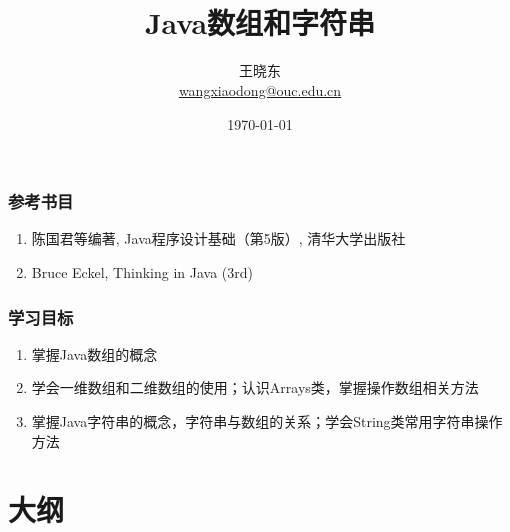 
\title[Wang Xiaodong]{\\  
  Java数组和字符串}
\author[王晓东]{王晓东\\
  \href{mailto:wangxiaodong@ouc.edu.cn}{\footnotesize wangxiaodong@ouc.edu.cn}}
\date{\today}


\frame{\titlepage}

\begin{frame}
\frametitle{参考书目}
\begin{enumerate}
\item 陈国君等编著, Java程序设计基础（第5版）, 清华大学出版社
\item Bruce Eckel, Thinking in Java (3rd)
\end{enumerate}  
\end{frame}

\begin{frame}
  \frametitle{学习目标}
  \begin{enumerate}
  \item 掌握Java数组的概念
  \item 学会一维数组和二维数组的使用；认识Arrays类，掌握操作数组相关方法
  \item 掌握Java字符串的概念，字符串与数组的关系；学会String类常用字符串操作方法
  \end{enumerate}
\end{frame}

\section*{大纲}

